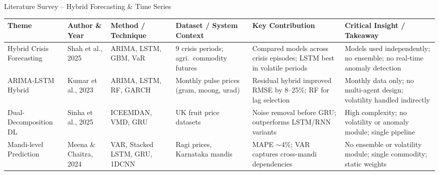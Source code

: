 \documentclass{beamer}
\begin{document}
\begin{frame}[label=lit_forecast]{Literature Survey -- Hybrid Forecasting \& Time Series}
\hypertarget{lit_vol}{}%
\setlength{\tabcolsep}{2pt}
\renewcommand{\arraystretch}{1.3}
\tiny

\begin{tcolorbox}[enhanced, colback=white, colframe=primaryblue!40, arc=4pt, boxrule=0.3pt,
  left=1pt, right=1pt, top=2pt, bottom=2pt, shadow={1pt}{-1pt}{0pt}{black!10}]
\begin{adjustbox}{max width=\textwidth, max height=0.7\textheight}
\begin{tabular}{|L{1.5cm}|L{1.4cm}|L{1.6cm}|L{1.8cm}|L{2.0cm}|L{2.3cm}|}
\hline
{}
\textbf{Theme} & \textbf{Author \& Year} & \textbf{Method / Technique} & \textbf{Dataset / System Context} & \textbf{Key Contribution} & \textbf{Critical Insight / Takeaway} \\
\hline
Hybrid Crisis Forecasting & Shah et al., 2025 & ARIMA, LSTM, GBM, VaR & 9 crisis periods; agri.\ commodity futures & Compared models across crisis episodes; LSTM best in volatile periods & Models used independently; no ensemble; no real-time anomaly detection \\ \hline
ARIMA-LSTM Hybrid & Kumar et al., 2023 & ARIMA, LSTM, RF, GARCH & Monthly pulse prices (gram, moong, urad) & Residual hybrid improved RMSE by 8--25\%; RF for lag selection & Monthly data only; no multi-agent design; volatility handled indirectly \\ \hline
Dual-Decomposition DL & Sinha et al., 2025 & ICEEMDAN, VMD, GRU & UK fruit price datasets & Noise removal before GRU; outperforms LSTM/RNN variants & High complexity; no volatility or anomaly module; single pipeline \\ \hline
Mandi-level Prediction & Meena \& Chaitra, 2024 & VAR, Stacked LSTM, GRU, 1DCNN & Ragi prices, Karnataka mandis & MAPE $\sim$4\%; VAR captures cross-mandi dependencies & No ensemble or volatility module; single commodity; static weights \\ \hline
\end{tabular}
\end{adjustbox}
\end{tcolorbox}

\end{frame}
\end{document}

